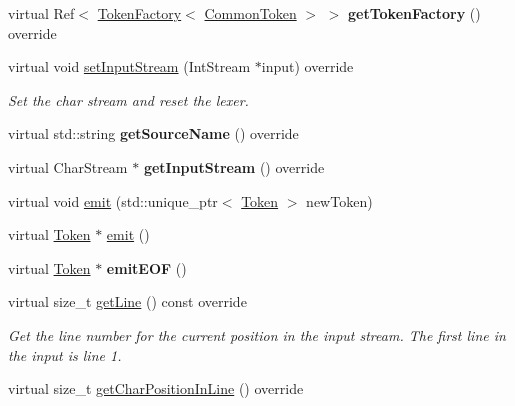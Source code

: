 \begin{DoxyCompactItemize}
\item 
\mbox{\label{classantlr4_1_1Lexer_a7ddfe1a731926e086396311b952fffb1}} 
virtual Ref$<$ \hyperlink{classantlr4_1_1TokenFactory}{Token\+Factory}$<$ \hyperlink{classantlr4_1_1CommonToken}{Common\+Token} $>$ $>$ {\bfseries get\+Token\+Factory} () override
\item 
\mbox{\label{classantlr4_1_1Lexer_a080037db0045be83a6884389a027f971}} 
virtual void \hyperlink{classantlr4_1_1Lexer_a080037db0045be83a6884389a027f971}{set\+Input\+Stream} (Int\+Stream $\ast$input) override
\begin{DoxyCompactList}\small\item\em Set the char stream and reset the lexer. \end{DoxyCompactList}\item 
\mbox{\label{classantlr4_1_1Lexer_a8ea74271ca660fcb5027331d16bd80bc}} 
virtual std\+::string {\bfseries get\+Source\+Name} () override
\item 
\mbox{\label{classantlr4_1_1Lexer_af664af4159f5c8a4e6901255670f866b}} 
virtual Char\+Stream $\ast$ {\bfseries get\+Input\+Stream} () override
\item 
virtual void \hyperlink{classantlr4_1_1Lexer_a8372c0ff70d9a70bc941e0322689aece}{emit} (std\+::unique\+\_\+ptr$<$ \hyperlink{classantlr4_1_1Token}{Token} $>$ new\+Token)
\item 
virtual \hyperlink{classantlr4_1_1Token}{Token} $\ast$ \hyperlink{classantlr4_1_1Lexer_abc214e5f1f83f7eb144faa12a5b8e900}{emit} ()
\item 
\mbox{\label{classantlr4_1_1Lexer_a813ff6ac8dd5fb3853ad48b3132956e9}} 
virtual \hyperlink{classantlr4_1_1Token}{Token} $\ast$ {\bfseries emit\+E\+OF} ()
\item 
virtual size\+\_\+t \hyperlink{classantlr4_1_1Lexer_a8ecc41ff09e40b469e519ed1b0d0912a}{get\+Line} () const override
\begin{DoxyCompactList}\small\item\em Get the line number for the current position in the input stream. The first line in the input is line 1. \end{DoxyCompactList}\item 
virtual size\+\_\+t \hyperlink{classantlr4_1_1Lexer_a6f2437c9681598c4d9475cb8a91bb2c0}{get\+Char\+Position\+In\+Line} () override

\end{DoxyCompactItemize}
